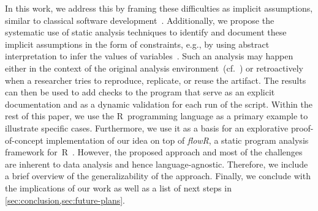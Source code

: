 In this work, we address this by framing these difficulties as implicit assumptions, similar to classical software development~\cite{mamun2011review}. Additionally, we propose the systematic use of static analysis techniques to identify and document these implicit assumptions in the form of constraints, e.g., by using abstract interpretation to infer the values of variables~\cite{DBLP:conf/popl/CousotC77,10.1145/3689609.3689996}.
Such an analysis may happen either in the context of the original analysis environment~(cf.~\cite{donat2025r4r}) or retroactively when a researcher tries to reproduce, replicate, or reuse the artifact.
The results can then be used to add checks to the program that serve as an explicit documentation and as a dynamic validation for each run of the script.
Within the rest of this paper, we use the R~programming language as a primary example to illustrate specific cases. Furthermore, we use it as a basis for an explorative proof-of-concept implementation of our idea on top of \textit{flowR}, a static program analysis framework for~R~\cite{floopsla}. However, the proposed approach and most of the challenges are inherent to data analysis and hence language-agnostic. Therefore, we include a brief overview of the generalizability of the approach. Finally, we conclude with the implications of our work as well as a list of next steps in \cref{sec:conclusion,sec:future-plans}.
